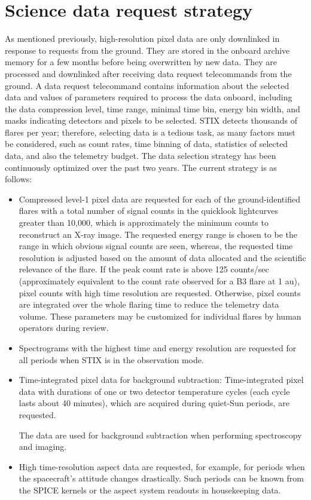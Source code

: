 \documentclass[referee]{preaa} %
\begin{document}
\section{Science data request strategy}
\label{sec:datareq}
As mentioned previously, high-resolution pixel data are only downlinked in response to requests from the
ground. They are stored in the onboard archive memory for a few months before being overwritten by new data. They are processed and downlinked 
after receiving data request telecommands from the ground. 
A data request telecommand contains information about the selected data and values of parameters  required to process the data onboard, including the data compression level, 
time range, minimal time bin, energy bin width, 
and  masks indicating detectors and pixels to be selected. 
STIX detects thousands of flares per year; therefore, 
selecting data is a tedious task, as many factors must be considered,  such as count rates, time binning of data, statistics of selected data, and also the telemetry budget. 
The data selection strategy has been continuously optimized over the past two years. The current strategy is as follows: 
\begin{itemize}
  \item  
 Compressed level-1 pixel data are requested for each of the ground-identified  flares with a total number of signal counts in the quicklook lightcurves greater than 10,000, which is approximately the minimum counts to reconstruct an X-ray image. 
The requested energy range is chosen to be the range in which obvious signal counts are seen,  
whereas, the requested time resolution is adjusted based on the amount of data allocated and the scientific relevance of the flare. 
If the peak count rate is above 125 counts/sec (approximately equivalent to the count rate observed for a B3 flare at 1 au), pixel counts with high time resolution are requested.  Otherwise, pixel counts are integrated over the whole flaring time to reduce the telemetry data volume.   These parameters may be customized for individual flares by human operators during review.
 \item  Spectrograms with the highest time and energy resolution are requested for all periods when STIX is in the observation mode. 
 \item Time-integrated pixel data for background subtraction:
Time-integrated pixel data with durations of one or two detector temperature cycles (each cycle lasts about 40 minutes), which are acquired during quiet-Sun periods, are requested. 

The data are used for background subtraction when performing spectroscopy and imaging. 
\item High time-resolution aspect data are requested, for example, for periods when the spacecraft's attitude changes drastically.
Such periods can be known from the SPICE kernels or the aspect system readouts in housekeeping data. 
\end{itemize}
\end{document}

